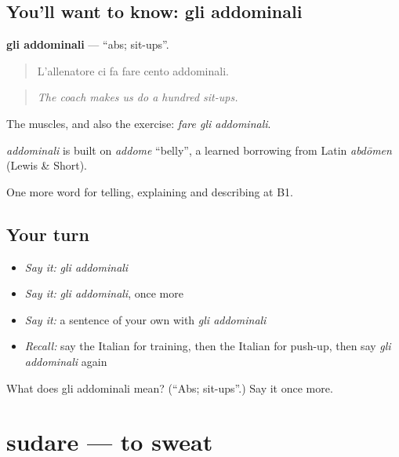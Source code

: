 \subsection*{You'll want to know: gli addominali}
\textbf{gli addominali} — \textquotedblleft{}abs; sit-ups\textquotedblright{}.

\begin{quote}
L'allenatore ci fa fare cento addominali.
\end{quote}

\begin{quote}
\emph{The coach makes us do a hundred sit-ups.}
\end{quote}

The muscles, and also the exercise: \emph{fare gli addominali}.

\begin{cousinweb}
\emph{addominali} is built on \emph{addome} \textquotedblleft{}belly\textquotedblright{}, a learned borrowing from Latin \emph{abdōmen} (Lewis \& Short).
\end{cousinweb}

\begin{grammarlens}[title={What you've built}]
One more word for telling, explaining and describing at B1.
\end{grammarlens}

\subsection*{Your turn}
\begin{itemize}
\raggedright
  \item \emph{Say it:} \emph{gli addominali}
  \item \emph{Say it:} \emph{gli addominali}, once more
  \item \emph{Say it:} a sentence of your own with \emph{gli addominali}
  \item \emph{Recall:} say the Italian for training, then the Italian for push-up, then say \emph{gli addominali} again
\end{itemize}

\begin{tcolorbox}[breakable,colback=teal!4,colframe=teal!35!black,title={Before you move on}]
What does gli addominali mean? (\textquotedblleft{}Abs; sit-ups\textquotedblright{}.) Say it once more.
\end{tcolorbox}
\section[sudare]{sudare — to sweat}

